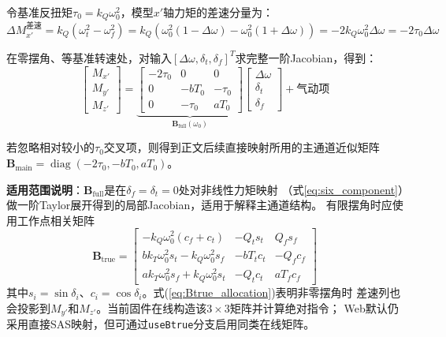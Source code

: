 令基准反扭矩$\tau_0=k_Q\omega_0^2$，模型$x'$轴力矩的差速分量为：
\begin{equation}
    \Delta M_{x'}^{\text{差速}} = k_Q (\omega_t^2 - \omega_f^2)
    = k_Q (\omega_0^2(1-\Delta\omega) - \omega_0^2(1+\Delta\omega))
    = -2 k_Q \omega_0^2 \Delta\omega
    = -2 \tau_0 \Delta\omega
    \label{eq:differential_roll}
\end{equation}

在零摆角、等基准转速处，对输入$[\Delta\omega,\delta_t,\delta_f]^T$求完整一阶Jacobian，得到：
\begin{equation}
    \boxed{
    \begin{bmatrix} M_{x'} \\ M_{y'} \\ M_{z'} \end{bmatrix}
    =
    \underbrace{
    \begin{bmatrix}
        -2\tau_0 & 0 & 0 \\
        0 & -b T_0 & -\tau_0 \\
        0 & -\tau_0 & a T_0
    \end{bmatrix}
    }_{\bm{B}_{\mathrm{full}}(\omega_0)}
    \begin{bmatrix} \Delta\omega \\ \delta_t \\ \delta_f \end{bmatrix}
    + \text{气动项}
    }
    \label{eq:effectiveness_matrix}
\end{equation}

若忽略相对较小的$\tau_0$交叉项，则得到正文后续直接映射所用的主通道近似矩阵
$\bm{B}_{\mathrm{main}}=\operatorname{diag}(-2\tau_0,-bT_0,aT_0)$。

\textbf{适用范围说明}：$\mathbf{B}_{\mathrm{full}}$是在$\delta_f=\delta_t=0$处对非线性力矩映射
（式\ref{eq:six_component}）做一阶Taylor展开得到的局部Jacobian，适用于解释主通道结构。
有限摆角时应使用工作点相关矩阵
\begin{equation}
\boxed{
\bm B_{\mathrm{true}}=
\begin{bmatrix}
-k_Q\omega_0^2(c_f+c_t) & -Q_t s_t & Q_f s_f\\
b k_T\omega_0^2s_t-k_Q\omega_0^2s_f & -bT_t c_t & -Q_f c_f\\
a k_T\omega_0^2s_f+k_Q\omega_0^2s_t & -Q_t c_t & aT_f c_f
\end{bmatrix}}
\label{eq:Btrue_allocation}
\end{equation}
其中$s_i=\sin\delta_i$、$c_i=\cos\delta_i$。式(\ref{eq:Btrue_allocation})表明非零摆角时
差速列也会投影到$M_{y'}$和$M_{z'}$。当前固件在线构造该$3\times3$矩阵并计算绝对指令；
Web默认仍采用直接SAS映射，但可通过\texttt{useBtrue}分支启用同类在线矩阵。

